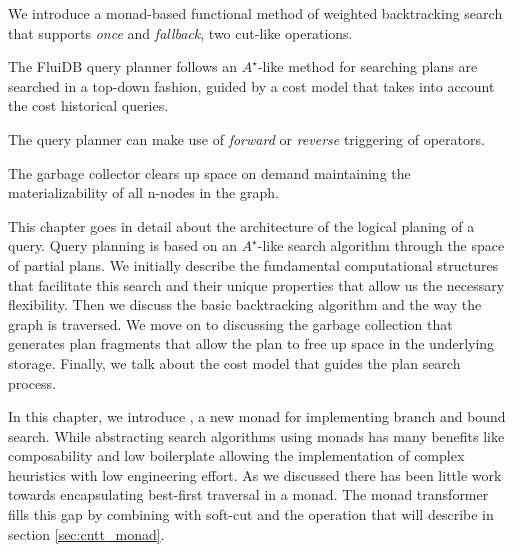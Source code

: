 
\begin{summary}
\item We introduce a monad-based functional method of weighted
  backtracking search that supports \emph{once} and \emph{fallback},
  two cut-like operations.
\item The FluiDB query planner follows an \(A^{\star}\)-like method for
  searching plans are searched in a top-down fashion, guided by a
  cost model that takes into account the cost historical queries.
\item The query planner can make use of \emph{forward} or
  \emph{reverse} triggering of operators.
\item The garbage collector clears up space on demand maintaining the
  materializability of all n-nodes in the graph.
\end{summary}

This chapter goes in detail about the architecture of the logical
planing of a query. Query planning is based on an \(A^{\star}\)-like
search algorithm through the space of partial plans. We initially
describe the fundamental computational structures that facilitate this
search and their unique properties that allow us the necessary
flexibility. Then we discuss the basic backtracking algorithm and the
way the graph is traversed. We move on to discussing the garbage
collection that generates plan fragments that allow the plan to free
up space in the underlying storage. Finally, we talk about the cost
model that guides the plan search process.

  In this chapter, we introduce , a new monad for
  implementing branch and bound search. While abstracting search
  algorithms using monads has many benefits like composability and low
  boilerplate allowing the implementation of complex heuristics with
  low engineering effort. As we discussed there has been little work
  towards encapsulating best-first traversal in a monad. The
   monad transformer fills this gap by combining
   with soft-cut and the  operation that
  will describe in section \ref{sec:cntt_monad}.

